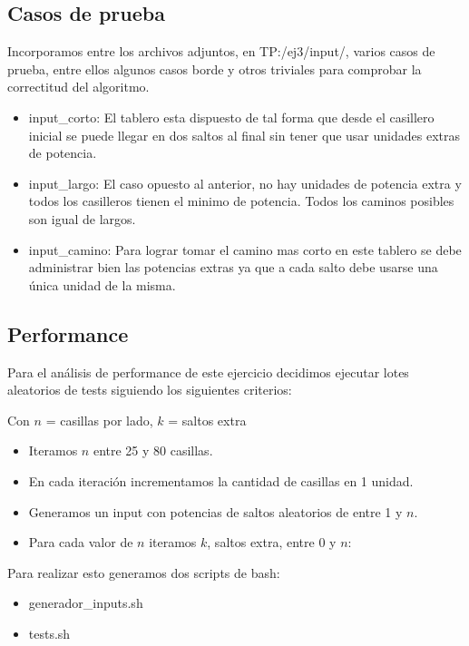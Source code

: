 \newpage
\subsection{Casos de prueba}

Incorporamos entre los archivos adjuntos, en TP:/ej3/input/, varios casos de prueba, entre ellos algunos casos borde y otros triviales para comprobar la correctitud del algoritmo.

\begin{itemize}
\item input\_corto: El tablero esta dispuesto de tal forma que desde el casillero inicial se puede llegar en dos saltos al final sin tener que usar unidades extras de potencia.
\item input\_largo: El caso opuesto al anterior, no hay unidades de potencia extra y todos los casilleros tienen el minimo de potencia. Todos los caminos posibles son igual de largos.
\item input\_camino: Para lograr tomar el camino mas corto en este tablero se debe administrar bien las potencias extras ya que a cada salto debe usarse una \'unica unidad de la misma.
\end{itemize}

\subsection{Performance}

Para el an\'alisis de performance de este ejercicio decidimos ejecutar lotes aleatorios de tests siguiendo los siguientes criterios:

Con $n$ = casillas por lado, $k$ = saltos extra

\begin{itemize}
	\item Iteramos $n$ entre 25 y 80 casillas.
	\item En cada iteraci\'on incrementamos la cantidad de casillas en 1 unidad.
	\item Generamos un input con potencias de saltos aleatorios de entre 1 y $n$.
	\item Para cada valor de $n$ iteramos $k$, saltos extra, entre 0 y $n$:
\end{itemize}

Para realizar esto generamos dos scripts de bash:
\begin{itemize}
	\item generador\_inputs.sh
	\item tests.sh
\end{itemize}


